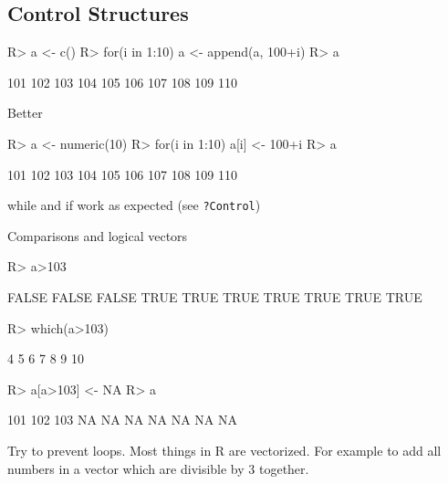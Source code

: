 \documentclass[fleqn, letter, 10pt]{article}
\begin{document}
\subsection{Control Structures}

\begin{Schunk}
\begin{Sinput}
R> a <- c()
R> for(i in 1:10) {a <- append(a, 100+i)}
R> a
\end{Sinput}
\begin{Soutput}
 [1] 101 102 103 104 105 106 107 108 109 110
\end{Soutput}
\end{Schunk}

Better
\begin{Schunk}
\begin{Sinput}
R> a <- numeric(10)
R> for(i in 1:10) {a[i] <- 100+i}
R> a
\end{Sinput}
\begin{Soutput}
 [1] 101 102 103 104 105 106 107 108 109 110
\end{Soutput}
\end{Schunk}

while and if work as expected (see \verb|?Control|)

Comparisons and logical vectors
\begin{Schunk}
\begin{Sinput}
R> a>103
\end{Sinput}
\begin{Soutput}
 [1] FALSE FALSE FALSE  TRUE  TRUE  TRUE  TRUE  TRUE  TRUE  TRUE
\end{Soutput}
\begin{Sinput}
R> which(a>103)
\end{Sinput}
\begin{Soutput}
[1]  4  5  6  7  8  9 10
\end{Soutput}
\end{Schunk}

\begin{Schunk}
\begin{Sinput}
R> a[a>103] <- NA
R> a
\end{Sinput}
\begin{Soutput}
 [1] 101 102 103  NA  NA  NA  NA  NA  NA  NA
\end{Soutput}
\end{Schunk}

Try to prevent loops. Most things in R are vectorized. For example
to add all numbers in a vector which are divisible by 3 together.
\end{document}
